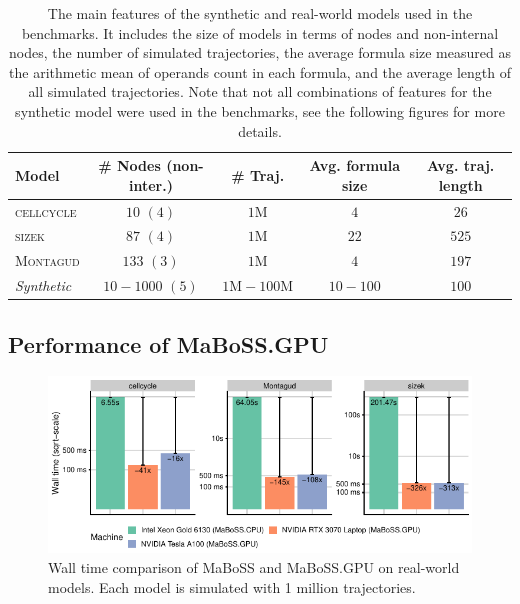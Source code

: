 \documentclass[sn-mathphys-num]{sn-jnl}%
\begin{document}
\begin{table}[h]
    \begin{tabular}{l|cccc}
        \textbf{Model}     & \textbf{\# Nodes (non-inter.)} & \textbf{\# Traj.}        & \textbf{Avg. formula size} & \textbf{Avg. traj. length} \\
        \midrule
        \textsc{cellcycle} & $10$ $(4)$                     & $1$M                     & $4$                        & $26$                       \\
        \textsc{sizek}     & $87$ $(4)$                     & $1$M                     & $22$                       & $525$                      \\
        \textsc{Montagud}  & $133$ $(3)$                    & $1$M                     & $4$                        & $197$                      \\
        \hline
        \emph{Synthetic}   & $10 - 1000$ $(5)$              & $1\text{M} - 100\text{M}$ & $10 - 100$                 & $100$                      \\
        \bottomrule
    \end{tabular}
    \centering
    \caption{The main features of the synthetic and real-world models used in the benchmarks. It includes the size of models in terms of nodes and non-internal nodes, the number of simulated trajectories, the average formula size measured as the arithmetic mean of operands count in each formula, and the average length of all simulated trajectories. Note that not all combinations of features for the synthetic model were used in the benchmarks, see the following figures for more details.}
    \label{tab:model_features}
\end{table}

\subsection{Performance of MaBoSS.GPU}

\begin{figure}
    \centering
    \includegraphics[width=\linewidth]{plots/real.pdf}
    \caption{Wall time comparison of MaBoSS and MaBoSS.GPU on real-world models. Each model is simulated with 1 million trajectories.}
    \label{fig:real}
\end{figure}
\end{document}
